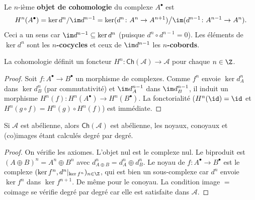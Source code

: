 \begin{definition}\label{def:cohomology}
Le $n$-ième \textbf{objet de cohomologie}
du complexe $A^\bullet$ est
\[
  H^n(A^\bullet) = \ker d^n / \im d^{n-1}
  = \ker(d^n \colon A^n \to A^{n+1}) \big/ \im(d^{n-1} \colon A^{n-1} \to A^n).
\]
Ceci a un sens car $\im d^{n-1} \subseteq \ker d^n$ (puisque $d^n \circ d^{n-1} = 0$).
Les éléments de $\ker d^n$ sont les \textbf{$n$-cocycles}
et ceux de $\im d^{n-1}$ les \textbf{$n$-cobords}.
\end{definition}

\begin{proposition}\label{prop:cohomology-functor}
La cohomologie définit un foncteur
$H^n \colon \mathsf{Ch}(\mathcal{A}) \to \mathcal{A}$
pour chaque $n \in \Z$.
\end{proposition}

\begin{proof}
Soit $f \colon A^\bullet \to B^\bullet$ un morphisme de complexes.
Comme $f^n$ envoie $\ker d_A^n$ dans $\ker d_B^n$ (par commutativité)
et $\im d_A^{n-1}$ dans $\im d_B^{n-1}$, il induit un morphisme
$H^n(f) \colon H^n(A^\bullet) \to H^n(B^\bullet)$. La fonctorialité
($H^n(\id) = \id$ et $H^n(g \circ f) = H^n(g) \circ H^n(f)$) est
immédiate.
\end{proof}

\begin{proposition}\label{prop:Ch-abelian}
Si $\mathcal{A}$ est abélienne, alors $\mathsf{Ch}(\mathcal{A})$ est
abélienne, les noyaux, conoyaux et (co)images étant calculés degré
par degré.
\end{proposition}

\begin{proof}
On vérifie les axiomes. L'objet nul est le complexe nul.
Le biproduit est $(A \oplus B)^n = A^n \oplus B^n$ avec
$d_{A \oplus B}^n = d_A^n \oplus d_B^n$.
Le noyau de $f \colon A^\bullet \to B^\bullet$ est le complexe
$(\ker f^n, d^n|_{\ker f^n})_{n \in \Z}$, qui est bien un sous-complexe
car $d^n$ envoie $\ker f^n$ dans $\ker f^{n+1}$. De même pour le
conoyau. La condition image $=$ coimage se vérifie degré par degré
car elle est satisfaite dans $\mathcal{A}$.
\end{proof}


